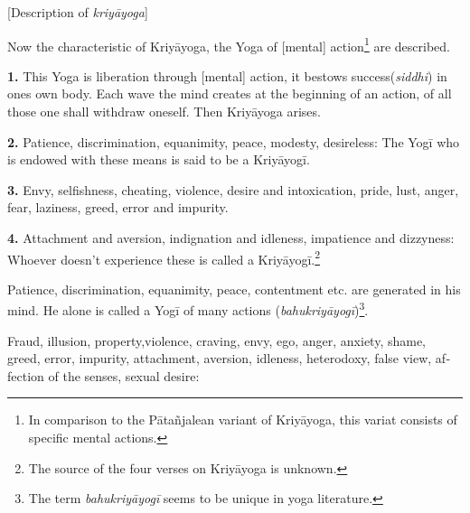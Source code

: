 \begin{otherlanguage}{english}
\begin{tlate}
   \end{tlate}
      \centerline{\textrm{\small{[Description of \textit{kriyāyoga}]}}}
      \bigskip
      \begin{tlate}
        Now the characteristic of Kriyāyoga, the Yoga of [mental] action\footnote{In comparison to the Pātañjalean variant of Kriyāyoga, this variat consists of specific mental actions.} are described. \bigskip
      \end{tlate}
\begin{tlate}\textbf{1.}
  This Yoga is liberation through [mental] action, it bestows success(\textit{siddhi}) in ones own body. Each wave the mind creates at the beginning of an action, of all those one shall withdraw oneself. Then Kriyāyoga arises. \bigskip \bigskip
\end{tlate}
      \begin{tlate}
        \textbf{2.} Patience, discrimination, equanimity, peace, modesty, desireless: The Yogī who is endowed with these means is said to be a Kriyāyogī. \bigskip \bigskip
      \end{tlate}
     \begin{tlate}
       \textbf{3.} Envy, selfishness, cheating, violence, desire and intoxication, pride, lust, anger, fear, laziness, greed, error and impurity. \bigskip \bigskip
     \end{tlate}
      \begin{tlate}
        \textbf{4.} Attachment and aversion, indignation and idleness, impatience and dizzyness: Whoever doesn't experience these is called a Kriyāyogī.\footnote{The source of the four verses on Kriyāyoga is unknown.} \bigskip \bigskip
      \end{tlate}
 \begin{tlate}
   Patience, discrimination, equanimity, peace, contentment etc. are generated in his mind. He alone is called a Yogī of many actions (\textit{bahukriyāyogī})\footnote{The term \textit{bahukriyāyogī} seems to be unique in yoga literature.}. \bigskip
 \end{tlate}
   \begin{tlate}
     Fraud, illusion, property,violence, craving, envy, ego, anger, anxiety, shame, greed, error, impurity, attachment, aversion, idleness, heterodoxy, false view, affection of the senses, sexual desire:\\

\end{tlate}
\end{otherlanguage}
